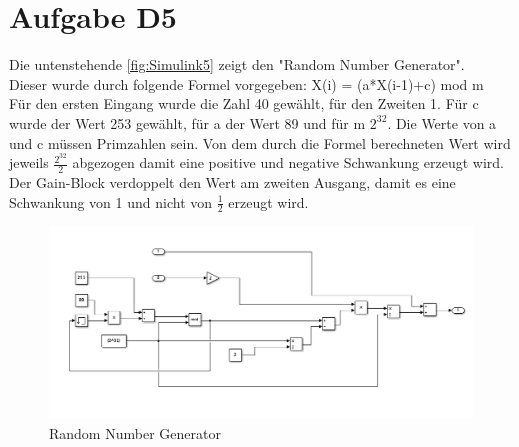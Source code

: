 
\chapter{Aufgabe D5}
Die untenstehende \autoref{fig:Simulink5} zeigt den "Random Number Generator". \\
Dieser wurde durch folgende Formel vorgegeben: X(i) = (a*X(i-1)+c) mod m\\
Für den ersten Eingang wurde die Zahl 40 gewählt, für den Zweiten 1.
Für c wurde der Wert 253 gewählt, für a der Wert 89 und für m $2^{32}$. Die Werte von a und c müssen Primzahlen sein. Von dem durch die Formel berechneten Wert wird jeweils $\frac{2^{32}}{2}$ abgezogen damit eine positive und negative Schwankung erzeugt wird. Der Gain-Block verdoppelt den Wert am zweiten Ausgang, damit es eine Schwankung von 1 und nicht von $\frac{1}{2}$ erzeugt wird.

\begin{figure}[h!]
	\centering
	\includegraphics[width=1\linewidth]{../Graphiken/Simulink5}
	\caption{Random Number Generator}
	\label{fig:Simulink5}
\end{figure}